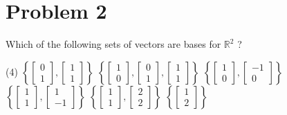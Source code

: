 \documentclass[letter,11pt]{article}
\theoremstyle{definition}
\begin{document}
\newpage
\section{Problem 2}
Which of the following sets of vectors are bases for $\mathbb{R}^{2}$ ?

\begin{tasks}(4)
    \task $\left\{\begin{bmatrix} 0 \\ 1 \end{bmatrix}, \begin{bmatrix} 1 \\ 1 \end{bmatrix}\right\}$
    \task $\left\{\begin{bmatrix} 1 \\ 0 \end{bmatrix}, \begin{bmatrix} 0 \\ 1 \end{bmatrix}, \begin{bmatrix} 1 \\ 1 \end{bmatrix}\right\}$
    \task $\left\{\begin{bmatrix} 1 \\ 0 \end{bmatrix}, \begin{bmatrix} -1 \\ 0 \end{bmatrix}\right\}$
    \task $\left\{\begin{bmatrix} 1 \\ 1 \end{bmatrix}, \begin{bmatrix} 1 \\ -1 \end{bmatrix}\right\}$
    \task $\left\{\begin{bmatrix} 1 \\ 1 \end{bmatrix}, \begin{bmatrix} 2 \\ 2 \end{bmatrix}\right\}$
    \task $\left\{\begin{bmatrix} 1 \\ 2 \end{bmatrix}\right\}$
\end{tasks}
\end{document}
